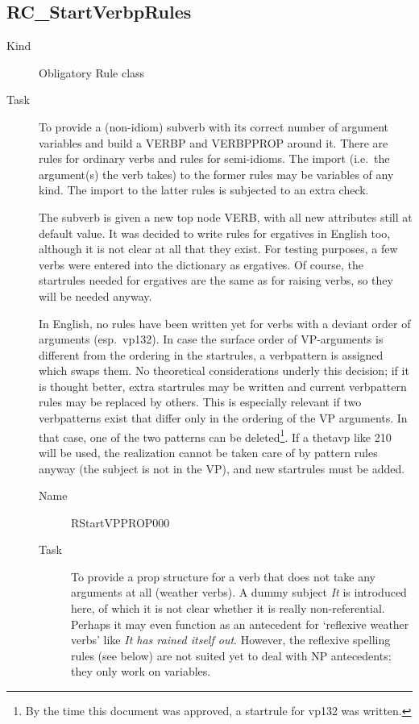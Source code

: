 \newpage
\subsection{RC\_StartVerbpRules}
\begin{description}
\item[Kind] Obligatory Rule class
\item[Task] To provide a (non-idiom) subverb with its correct number of 
argument variables and build a VERBP and VERBPPROP around it. There are rules
for ordinary verbs and rules for semi-idioms.
The import (i.e.\ the 
argument(s) the verb takes) to the former rules may be variables of any kind.
The import to the latter rules is subjected to an extra check.

The subverb is given a new top node VERB, with all new attributes still at 
default value. It was decided to write rules 
for ergatives in English too, although it is not clear at all that they exist.
For testing purposes, a few verbs were entered into the dictionary as 
ergatives. Of course, the startrules needed for ergatives are the same 
as for raising verbs, so they will be needed anyway.

In English, no rules have been written yet for verbs with a deviant order of 
arguments (esp.\ vp132). In case the surface order of VP-arguments is different 
from the ordering in the startrules, a verbpattern is assigned which swaps 
them.
No theoretical considerations underly this decision; if it 
is thought better, extra startrules may be written and current verbpattern rules 
may be replaced by others. This is especially relevant if two verbpatterns 
exist that differ only in the ordering of the VP arguments. In that case, one 
of the two patterns can be deleted\footnote{By the 
time this document was approved, a startrule for vp132 was written.}. 
If a thetavp like 210 will be used, the realization
cannot be taken care of by pattern rules anyway (the subject is not in the VP), 
and new startrules must be added.

\vspace{1 cm}
\begin{description}
\item[Name] RStartVPPROP000
\item[Task] To provide a prop structure for a verb that does not take any 
arguments at all (weather verbs). A dummy subject {\em It\/} is introduced 
here, of which it is not clear whether it is really non-referential. Perhaps it 
may even function as an antecedent for `reflexive weather verbs' like 
{\em It has rained itself out\/}. However, the reflexive spelling rules (see 
below) are not suited yet to deal with NP antecedents; they only work on 
variables.


\end{description}
\end{description}
